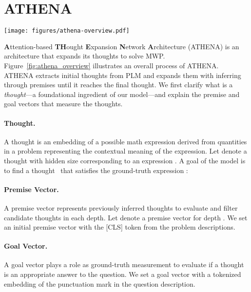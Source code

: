 \documentclass[11pt]{article}
\newcommand{\1}{\mathbb{1}}
\begin{document}
\section{ATHENA}
\label{sec:athena}
\begin{figure*}[t]
    \centering
    \texttt{[image: figures/athena-overview.pdf]}
    \vspace{-1.5em}
    \caption{Overall process of ATHENA. First, extract initial thoughts, an initial reasoning vector, and a goal vector from PLM. Second, expand thoughts by transform  or merge  and generate candidate thoughts. Third, infer the candidate thoughts to obtain new reasonable thoughts. Last, give reasonable thoughts to the next expansion. Repeat until meeting a thought that answers the goal vector.}
    \label{fig:athena_overview}
\end{figure*}

\textbf{A}ttention-based \textbf{TH}ought \textbf{E}xpansion \textbf{N}etwork \textbf{A}rchitecture (ATHENA) is an architecture that expands its thoughts to solve MWP.
Figure~\ref{fig:athena_overview} illustrates an overall process of ATHENA.
ATHENA extracts initial thoughts  from PLM and expands them with inferring through premises until it reaches the final thought.
We first clarify what is a 
\textit{thought}---a foundational ingredient of our model---and explain the premise and goal vectors that measure the thoughts.

\paragraph{Thought.}
A thought is an embedding of a possible math expression derived from quantities in a problem representing the contextual meaning of the expression.
Let  denote a thought with hidden size  corresponding to an expression .
A goal of the model is to find a thought~ that satisfies the ground-truth expression :


\paragraph{Premise Vector.}
A premise vector represents previously inferred thoughts to evaluate and filter candidate thoughts in each depth.
Let  denote a premise vector for depth .
We set an initial premise vector  with the [CLS] token from the problem descriptions.

\paragraph{Goal Vector.}
A goal vector plays a role as ground-truth measurement to evaluate if a thought is an appropriate answer to the question.
We set a goal vector  with a tokenized embedding of the punctuation mark in the question description.  
\end{document}
